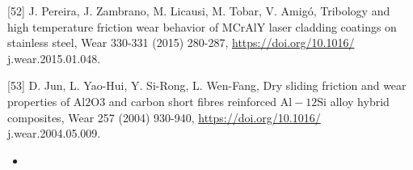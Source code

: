 \documentclass[10pt]{article}
\begin{document}
[52] J. Pereira, J. Zambrano, M. Licausi, M. Tobar, V. Amigó, Tribology and high temperature friction wear behavior of MCrAlY laser cladding coatings on stainless steel, Wear 330-331 (2015) 280-287, \href{https://doi.org/10.1016/}{https://doi.org/10.1016/} j.wear.2015.01.048.

[53] D. Jun, L. Yao-Hui, Y. Si-Rong, L. Wen-Fang, Dry sliding friction and wear properties of $\mathrm{Al} 2 \mathrm{O} 3$ and carbon short fibres reinforced $\mathrm{Al}-12 \mathrm{Si}$ alloy hybrid composites, Wear 257 (2004) 930-940, \href{https://doi.org/10.1016/}{https://doi.org/10.1016/} j.wear.2004.05.009.

\begin{itemize}
  \item 
\end{itemize}
\end{document}
